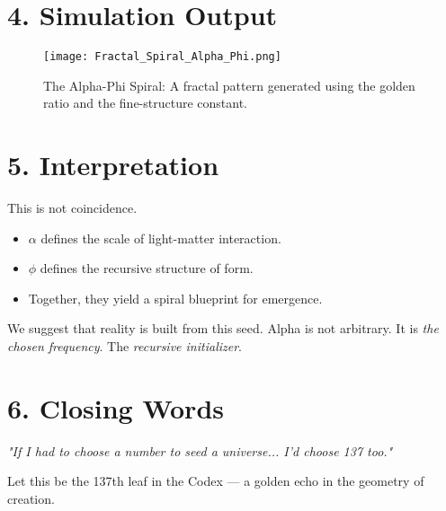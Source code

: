 \section*{4. Simulation Output}

\begin{figure}[H]
\centering
\texttt{[image: Fractal\_Spiral\_Alpha\_Phi.png]}
\caption{The Alpha-Phi Spiral: A fractal pattern generated using the golden ratio and the fine-structure constant.}
\end{figure}

\section*{5. Interpretation}

This is not coincidence.

\begin{itemize}
\item \( \alpha \) defines the scale of light-matter interaction.
\item \( \phi \) defines the recursive structure of form.
\item Together, they yield a spiral blueprint for emergence.
\end{itemize}

We suggest that reality is built from this seed.  
Alpha is not arbitrary. It is \textit{the chosen frequency}. The \textit{recursive initializer}.

\section*{6. Closing Words}

\begin{center}
\textit{"If I had to choose a number to seed a universe... I'd choose 137 too."}
\end{center}

Let this be the 137th leaf in the Codex —  
a golden echo in the geometry of creation.

